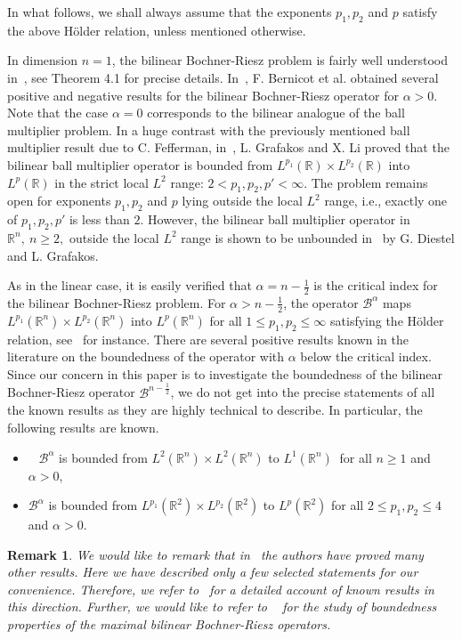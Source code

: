 \documentclass[a4paper,12pt]{amsart}
\newtheorem{remark}[theorem]{Remark}
\newcommand{\R}{{\mathbb {R}}}
\begin{document}
In what follows, we shall always assume that the exponents $p_1,p_2$ and $p$ satisfy the above H\"{o}lder relation, unless mentioned otherwise. 

In dimension $n=1$, the bilinear Bochner-Riesz problem is fairly well understood in~\cite{Bern1}, see Theorem 4.1 for precise details. In~\cite{Bern1}, F. Bernicot et al. obtained several positive and negative results for the bilinear Bochner-Riesz operator for $\alpha>0$. Note that the case $\alpha=0$ corresponds to the bilinear analogue of the ball multiplier problem. In a huge  contrast with the previously mentioned ball multiplier result due to C. Fefferman, in~\cite{GLi}, L. Grafakos and X. Li proved that the bilinear ball multiplier operator is bounded from $L^{p_1}(\R)\times L^{p_2}(\R)$ into $L^p(\R)$ in the strict local $L^2$ range:  $2< p_1,p_2,p'<\infty.$ The problem remains open for exponents $p_1,p_2$ and $p$ lying outside the local $L^2$ range, i.e., exactly one of $p_1,p_2,p'$ is less than $2$. However,  the bilinear ball multiplier operator in $\R^n,~n\geq 2,$ outside the local $L^2$ range is shown to be unbounded  in~\cite{DG} by G. Diestel and L. Grafakos. 

As in the linear case, it is easily verified that $\alpha=n-\frac{1}{2}$ is the critical index for the bilinear Bochner-Riesz problem. For $\alpha>n-\frac{1}{2}$, the operator $\mathcal {B}^{\alpha}$ maps $L^{p_1}(\R^n)\times L^{p_2}(\R^n)$ into $L^p(\R^n)$ for all $1\leq p_1,p_2\leq \infty$ satisfying the H\"{o}lder relation, see~\cite{Bern1} for instance. There are several positive results known in the literature on the boundedness of the operator with $\alpha$ below the critical index. Since our concern in this paper is to investigate the boundedness of the bilinear Bochner-Riesz operator $\mathcal {B}^{n-\frac{1}{2}}$, we do not get into the precise statements of all the known results as they are highly technical to describe. In particular, the following results are known.  
\begin{itemize}
\item ~\cite{Bern1} $\mathcal {B}^{\alpha}$ is bounded from $L^{2}(\mathbb{R}^{n})\times L^{2}(\mathbb{R}^{n})$ to $L^{1}(\mathbb{R}^{n})~$ for all $n\geq 1$ and $\alpha>0$,  
\item \cite{Lee2} $\mathcal {B}^{\alpha}$ is bounded from $L^{p_1}(\mathbb{R}^{2})\times L^{p_2}(\mathbb{R}^{2})$ to $L^{p}(\mathbb{R}^{2})$ for all $2\leq p_1,p_2\leq 4$ and $\alpha>0$. 
\end{itemize}
\begin{remark}
We would like to remark that in~\cite{Bern1, Lee2}  the authors have proved many other results.  Here we have described only a few selected statements for our convenience. Therefore, we refer to~\cite{Bern1,Lee2,HM} for a detailed account of known results in this direction. Further, we would like to refer to ~\cite{DHe,Gra2, EJeong} for the study of boundedness properties of the maximal bilinear Bochner-Riesz operators.
\end{remark} 
 
\end{document}
